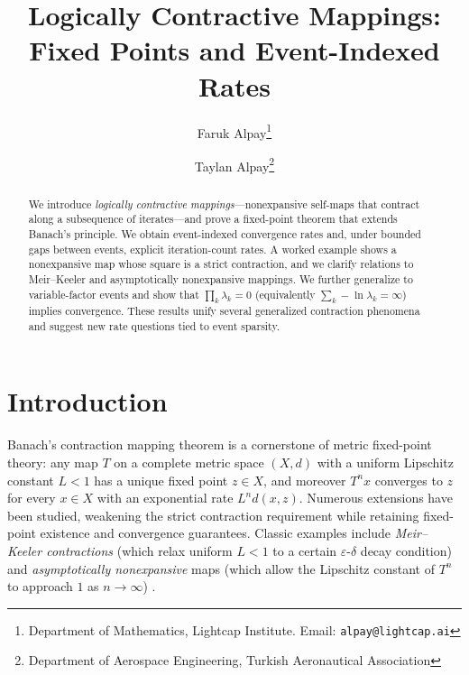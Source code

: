 \documentclass[11pt]{article}
\title{Logically Contractive Mappings: Fixed Points and Event-Indexed Rates}
\author{Faruk Alpay\thanks{Department of Mathematics, Lightcap Institute. Email: \texttt{alpay@lightcap.ai}} \and Taylan Alpay\thanks{Department of Aerospace Engineering, Turkish Aeronautical Association}}
\date{}
\theoremstyle{definition}
\theoremstyle{remark}
\begin{document}
\maketitle

\begin{abstract}
We introduce \emph{logically contractive mappings}---nonexpansive self-maps that contract along a subsequence of iterates---and prove a fixed-point theorem that extends Banach's principle. We obtain event-indexed convergence rates and, under bounded gaps between events, explicit iteration-count rates. A worked example shows a nonexpansive map whose square is a strict contraction, and we clarify relations to Meir--Keeler and asymptotically nonexpansive mappings. We further generalize to variable-factor events and show that $\prod_k \lambda_k = 0$ (equivalently $\sum_k -\ln \lambda_k = \infty$) implies convergence. These results unify several generalized contraction phenomena and suggest new rate questions tied to event sparsity.
\end{abstract}

\section{Introduction}
Banach's contraction mapping theorem is a cornerstone of metric fixed-point theory: any map $T$ on a complete metric space $(X,d)$ with a uniform Lipschitz constant $L<1$ has a unique fixed point $z\in X$, and moreover $T^n x$ converges to $z$ for every $x\in X$ with an exponential rate $L^n d(x,z)$. Numerous extensions have been studied, weakening the strict contraction requirement while retaining fixed-point existence and convergence guarantees. Classic examples include \emph{Meir--Keeler contractions} \cite{2} (which relax uniform $L<1$ to a certain $\varepsilon$-$\delta$ decay condition) and \emph{asymptotically nonexpansive} maps (which allow the Lipschitz constant of $T^n$ to approach $1$ as $n\to\infty$) \cite{3}.
\end{document}
